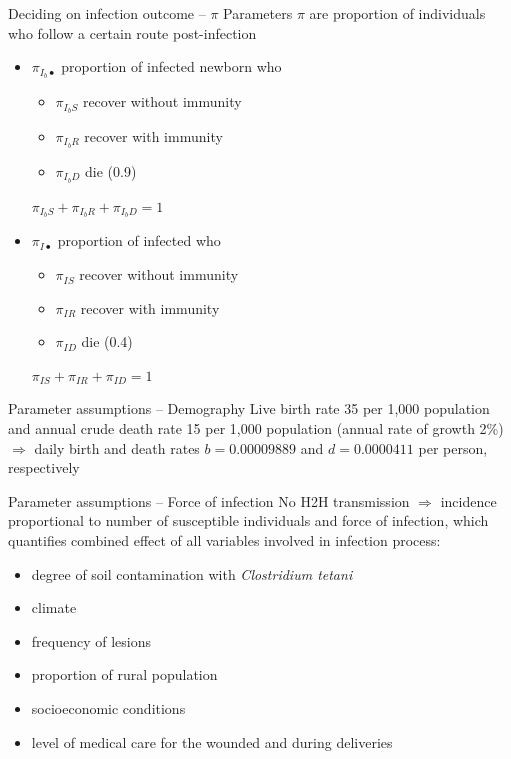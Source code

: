 \documentclass[aspectratio=169]{beamer}
\begin{document}
\begin{frame}{Deciding on infection outcome -- $\pi$}
  Parameters $\pi$ are proportion of individuals who follow a certain route post-infection
  \vfill
  \begin{itemize}
    \item $\pi_{I_b\bullet}$ proportion of infected newborn who
    \begin{itemize}
      \item $\pi_{I_bS}$ recover without immunity
      \item $\pi_{I_bR}$ recover with immunity
      \item $\pi_{I_bD}$ die (0.9)
    \end{itemize}
    $\pi_{I_bS}+\pi_{I_bR}+\pi_{I_bD}=1$
    \vfill
    \item $\pi_{I\bullet}$ proportion of infected who
    \begin{itemize}
      \item $\pi_{IS}$ recover without immunity
      \item $\pi_{IR}$ recover with immunity
      \item $\pi_{ID}$ die (0.4)
    \end{itemize}
    $\pi_{IS}+\pi_{IR}+\pi_{ID}=1$
  \end{itemize}
\end{frame}

\begin{frame}{Parameter assumptions -- Demography}
  Live birth rate 35 per 1,000 population and annual crude death rate 15 per 1,000 population (annual rate of growth 2\%) $\Rightarrow$ daily birth and death rates $b=0.00009889$ and $d=0.0000411$ per person, respectively
\end{frame}

\begin{frame}{Parameter assumptions -- Force of infection}
  No H2H transmission $\Rightarrow$ incidence proportional to number of susceptible individuals and force of infection, which quantifies combined effect of all variables involved in infection process:
  \begin{itemize}
    \item degree of soil contamination with \emph{Clostridium tetani}
    \item climate
    \item frequency of lesions
    \item proportion of rural population
    \item socioeconomic conditions
    \item level of medical care for the wounded and during deliveries
  \end{itemize}
\end{frame}
\end{document}
